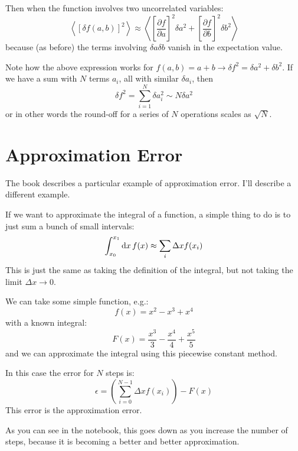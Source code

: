 Then when the function involves two uncorrelated variables:
\begin{equation}
\left\langle \left[\delta f(a, b)\right]^2 \right\rangle \approx 
\left\langle
\left[\frac{\partial f}{\partial a}\right]^2 \delta a^2
+ \left[\frac{\partial f}{\partial b}\right]^2 \delta b^2
\right\rangle
\end{equation}
because (as before) the terms involving $\delta a \delta b$ vanish in
the expectation value.

Note how the above expression works for $f(a, b) = a +b \rightarrow
\delta f^2 = \delta a^2 + \delta b^2$. If we have a sum with $N$
terms $a_i$, all with similar $\delta a_i$, then
\begin{equation}
\delta f^2 = \sum_{i=1}^N \delta a_i^2 \sim N \delta a^2
\end{equation}
or in other words the round-off for a series of $N$ operations scales
as $\sqrt{N}$.

\section{Approximation Error}

The book describes a particular example of approximation error. I'll
describe a different example.

If we want to approximate the integral of a function, a simple thing
to do is to just sum a bunch of small intervals:
\begin{equation}
\int_{x_0}^{x_1} {\rm d}x\,f(x) \approx \sum_i \Delta x f(x_i)
\end{equation}
This is just the same as taking the definition of the integral, but
not taking the limit $\Delta x \rightarrow 0$. 

We can take some simple function, e.g.:
\begin{equation}
f(x) = x^2 - x^3 + x^4
\end{equation}
with a known integral:
\begin{equation}
F(x) = \frac{x^3}{3} - \frac{x^4}{4} + \frac{x^5}{5}
\end{equation}
and we can approximate the integral using this piecewise constant
method.

In this case the error for $N$ steps is:
\begin{equation}
\epsilon = \left(\sum_{i=0}^{N-1} \Delta x f(x_i) \right) - F(x)
\end{equation}
This error is the approximation error. 

As you can see in the notebook, this goes down as you increase the
number of steps, because it is becoming a better and better
approximation.

